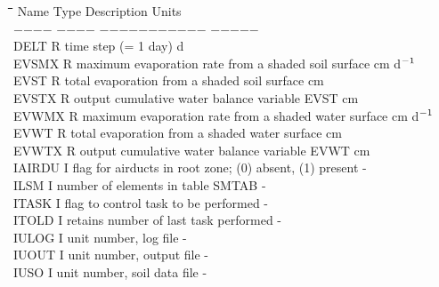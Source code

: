 \documentclass[11pt]{article}
\begin{document}
\begin{tabbing}
\hspace{1.27cm}\=\hspace{1.27cm}\=\hspace{1.27cm}\=\hspace{1.27cm}\=%
\hspace{1.27cm}\=\hspace{1.27cm}\=\hspace{1.27cm}\=\hspace{1.27cm}\=%
\hspace{1.27cm}\=\hspace{1.27cm}\=\kill
Name    \> \> Type   \> Description                                        \> \> \> \> \> \> \> Units\\
$-$$-$$-$$-$    \> \> $-$$-$$-$$-$   \> $-$$-$$-$$-$$-$$-$$-$$-$$-$$-$$-$                                        \> \> \> \> \> \> \> $-$$-$$-$$-$$-$\\
DELT\> \> R\> time step (= 1 day)\> \> \> \> \> \> \> d\\
EVSMX\> \> R\> maximum evaporation rate from a shaded soil surface\> \> \> \> \> \> \> cm d$^{{\rm -1}}$\\
EVST\> \> R\> total evaporation from a shaded soil surface\> \> \> \> \> \> \> cm\\
EVSTX\> \> R\> output cumulative water balance variable EVST\> \> \> \> \> \> \> cm\\
EVWMX\> \> R\> maximum evaporation rate from a shaded water surface\> \> \> \> \> \> \> cm d$^{{\rm -1}}$\\
EVWT\> \> R\> total evaporation from a shaded water surface\> \> \> \> \> \> \> cm\\
EVWTX\> \> R\> output cumulative water balance variable EVWT\> \> \> \> \> \> \> cm\\
IAIRDU\> \> I\> flag for airducts in root zone; (0) absent, (1) present\> \> \> \> \> \> \> -\\
ILSM\> \> I\> number of elements in table SMTAB\> \> \> \> \> \> \> -\\
ITASK\> \> I\> flag to control task to be performed\> \> \> \> \> \> \> -\\
ITOLD\> \> I\> retains number of last task performed\> \> \> \> \> \> \> -\\
IULOG\> \> I\> unit number, log file\> \> \> \> \> \> \> -\\
IUOUT\> \> I\> unit number, output file\> \> \> \> \> \> \> -\\
IUSO\> \> I\> unit number, soil data file\> \> \> \> \> \> \> -\\

\end{tabbing}
\end{document}
